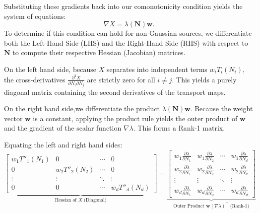 \documentclass[12pt,a4paper,twoside,openany]{book}
\begin{document}
Substituting these gradients back into our comonotonicity condition yields the system of equations:
\begin{equation}
    \nabla X = \lambda(\mathbf{N}) \mathbf{w}.
\end{equation}
To determine if this condition can hold for non-Gaussian sources, we differentiate both the Left-Hand Side (LHS) and the Right-Hand Side (RHS) 
with respect to $\mathbf{N}$ to compute their respective Hessian (Jacobian) matrices.

On the left hand side, because $X$ separates into independent terms $w_i T_i(N_i)$, the cross-derivatives $\frac{\partial^2 X}{\partial N_i \partial N_j}$ 
are strictly zero for all $i \neq j$. This yields a purely diagonal matrix containing the second derivatives of the transport maps.

On the right hand side,we differentiate the product $\lambda(\mathbf{N}) \mathbf{w}$. Because the weight vector $\mathbf{w}$ is a constant, 
applying the product rule yields the outer product of $\mathbf{w}$ and the gradient of the scalar function $\nabla \lambda$. This forms a Rank-1 matrix.

Equating the left and right hand sides:
\begin{equation}
    \underbrace{
    \begin{bmatrix} 
    w_1 T''_1(N_1) & 0 & \cdots & 0 \\
    0 & w_2 T''_2(N_2) & \cdots & 0 \\
    \vdots & \vdots & \ddots & \vdots \\
    0 & 0 & \cdots & w_d T''_d(N_d)
    \end{bmatrix}
    }_{\text{Hessian of } X \text{ (Diagonal)}}
    =
    \underbrace{
    \begin{bmatrix}
    w_1 \frac{\partial \lambda}{\partial N_1} & w_1 \frac{\partial \lambda}{\partial N_2} & \cdots & w_1 \frac{\partial \lambda}{\partial N_d} \\
    w_2 \frac{\partial \lambda}{\partial N_1} & w_2 \frac{\partial \lambda}{\partial N_2} & \cdots & w_2 \frac{\partial \lambda}{\partial N_d} \\
    \vdots & \vdots & \ddots & \vdots \\
    w_d \frac{\partial \lambda}{\partial N_1} & w_d \frac{\partial \lambda}{\partial N_2} & \cdots & w_d \frac{\partial \lambda}{\partial N_d}
    \end{bmatrix}
    }_{\text{Outer Product } \mathbf{w} (\nabla \lambda)^\top \text{ (Rank-1)}}
\end{equation}
\end{document}
